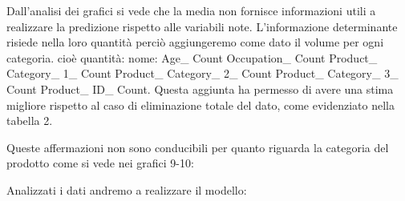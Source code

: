 \documentclass{article}
\begin{document}
\begin{figure}[htp!]
\centering
{}
\end{figure}

Dall'analisi dei grafici si vede che la media non fornisce informazioni utili a realizzare la predizione rispetto alle variabili note. L'informazione determinante risiede nella loro quantità perciò aggiungeremo come dato il volume per ogni categoria. cioè quantità: nome: Age\_ Count 	Occupation\_ Count 	Product\_ Category\_ 1\_ Count Product\_ Category\_ 2\_ Count 	Product\_ Category\_ 3\_ Count 	Product\_ ID\_ Count. 
Questa aggiunta ha permesso di avere una stima migliore rispetto al caso di eliminazione totale del dato, come evidenziato nella tabella 2.

Queste affermazioni non sono conducibili per quanto riguarda la categoria del prodotto come si vede nei  grafici 9-10:
\begin{figure}[htp!]
\centering
{}
\end{figure}

Analizzati i dati andremo a realizzare il modello:
 
\end{document}
